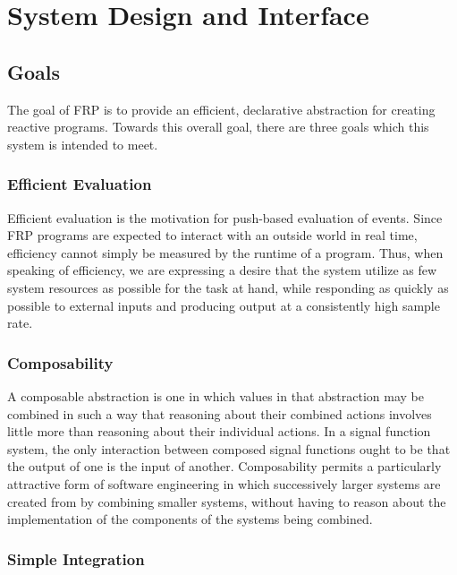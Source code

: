 \chapter{System Design and Interface}
\label{chapter:System_Design_and_Interface}

\section{Goals}
\label{section:System_Design_and_Interface-Goals}

The goal of FRP is to provide an efficient, declarative abstraction for creating
reactive programs. Towards this overall goal, there are three goals which this
system is intended to meet.

\subsection{Efficient Evaluation}
\label{subsection:System_Design_and_Interface-Goals-Efficient_and_Push_based_Evaluation}

Efficient evaluation is the motivation for push-based evaluation of events.
Since FRP programs are expected to  interact with an outside world in real time,
efficiency cannot simply be measured by the runtime of a program. Thus, when speaking of efficiency,
we are expressing a desire that the system utilize as few system resources as possible
for the task at hand, while responding as quickly as possible to external inputs and
producing output at a consistently high sample rate.

\subsection{Composability}
\label{subsection:System_Design_and_Interface-Goals-Composability}

A composable abstraction is one in which values in that abstraction may be
combined in such a way that reasoning about their combined actions involves
little more than reasoning about their individual actions. In a signal function
system, the only interaction between composed signal functions ought to be that
the output of one is the input of another. Composability permits a particularly
attractive form of software engineering in which successively larger systems are
created from by combining smaller systems, without having to reason about the 
implementation of the components of the systems being combined.

\subsection{Simple Integration}
\label{subsection:System_Design_and_Interface-Goals-Ease_of_Integration}

